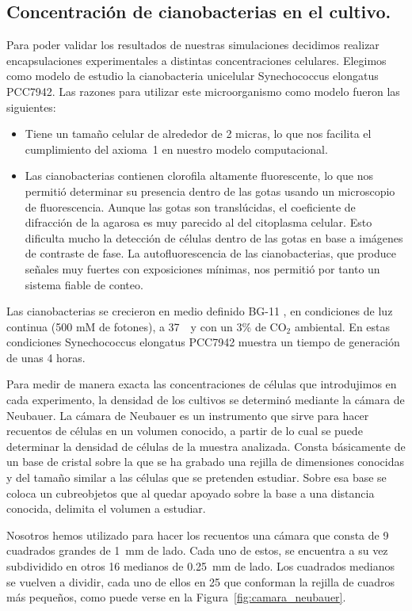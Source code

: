 \subsection{Concentración de cianobacterias en el cultivo.}

Para poder validar los resultados de nuestras simulaciones decidimos realizar encapsulaciones experimentales a distintas concentraciones celulares. Elegimos como modelo de estudio la cianobacteria unicelular Synechococcus elongatus PCC7942. Las razones para utilizar este microorganismo como modelo fueron las siguientes:

\begin{itemize}
    \item Tiene un tamaño celular de alrededor de 2 micras, lo que nos facilita el cumplimiento del axioma~1 en nuestro modelo computacional.
    \item Las cianobacterias contienen clorofila altamente fluorescente, lo que nos permitió determinar su presencia dentro de las gotas usando un microscopio de fluorescencia. Aunque las gotas son translúcidas, el coeficiente de difracción de la agarosa es muy parecido al del citoplasma celular. Esto dificulta mucho la detección de células dentro de las gotas en base a imágenes de contraste de fase. La autofluorescencia de las cianobacterias, que produce señales muy fuertes con exposiciones mínimas, nos permitió por tanto un sistema fiable de conteo. 
\end{itemize}

Las cianobacterias se crecieron en medio definido BG-11 , en condiciones de luz continua (500 mM de fotones), a 37~\celsius\ y con un 3\% de $\mathrm{CO}_{2}$ ambiental. En estas condiciones Synechococcus elongatus PCC7942 muestra un tiempo de generación de unas 4 horas. 

Para medir de manera exacta las concentraciones de células que introdujimos en cada experimento, la densidad de los cultivos se determinó mediante la cámara de Neubauer. La cámara de Neubauer es un instrumento que sirve para hacer recuentos de células en un volumen conocido, a partir de lo cual se puede determinar la densidad de células de la muestra analizada. Consta básicamente de un base de cristal sobre la que se ha grabado una rejilla de dimensiones conocidas y del tamaño similar a las células que se pretenden estudiar. Sobre esa base se coloca un cubreobjetos que al quedar apoyado sobre la base a una distancia conocida, delimita el volumen a estudiar.

Nosotros hemos utilizado para hacer los recuentos una cámara que consta de 9 cuadrados grandes de 1~mm de lado. Cada uno de estos, se encuentra a su vez subdividido en otros 16 medianos de 0.25~mm de lado. Los cuadrados medianos se vuelven a dividir, cada uno de ellos en 25 que conforman la rejilla de cuadros más pequeños, como puede verse en la Figura~\ref{fig:camara_neubauer}. 


